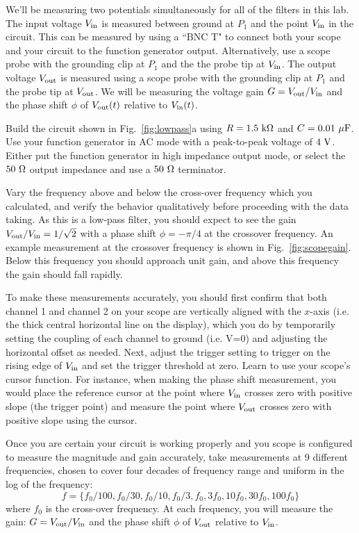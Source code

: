 \documentclass[12pt]{article}
\begin{document}
We'll be measuring two potentials simultaneously for all of the filters in this lab.  The input voltage $V_{\rm in}$ is measured between ground at $P_1$ and the point $V_{\rm in}$ in the circuit.  This can be measured by using a ``BNC T" to connect both your scope and your circuit to the function generator output.  Alternatively, use a scope probe with the grounding clip at $P_1$ and the the probe tip at $V_{\rm in}$.  The output voltage $V_{\rm out}$ is measured using a scope probe with the grounding clip at $P_1$ and the probe tip at $V_{\rm out}$.  We will be measuring the voltage gain $G = V_{\rm out} / V_{\rm in}$ and the phase shift $\phi$ of $V_{\rm out}(t)$ relative to $V_{\rm in}(t)$. 

Build the circuit shown in Fig.~\ref{fig:lowpass}a using $R=1.5~\rm k \Omega$ and $C= 0.01~\rm \mu F$.   Use your function generator in AC mode with a peak-to-peak voltage of $4~\rm V$.   Either put the function generator in high impedance output mode, or select the $50~\rm \Omega$ output impedance and use a $50~\rm \Omega$ terminator.

Vary the frequency above and below the cross-over frequency which you calculated, and verify the behavior qualitatively before proceeding with the data taking.  As this is a low-pass filter, you should expect to see the gain $V_{\rm out}/V_{\rm in} = 1/\sqrt{2}$ with a phase shift $\phi = -\pi/4$ at the crossover frequency.  An example measurement at the crossover frequency is shown in Fig.~\ref{fig:scopegain}.  Below this frequency you should approach unit gain, and above this frequency the gain should fall rapidly.  

To make these measurements accurately, you should first confirm that both channel 1 and channel 2 on your scope are vertically aligned with the $x$-axis (i.e. the thick central horizontal line on the display), which you do by temporarily setting the coupling of each channel to ground (i.e. V=0) and adjusting the horizontal offset as needed.  Next, adjust the trigger setting to trigger on the rising edge of $V_{\rm in}$ and set the trigger threshold at zero.  Learn to use your scope's cursor function.  For instance, when making the phase shift measurement, you would place the reference cursor at the point where 
$V_{\rm in}$ crosses zero with positive slope (the trigger point) and measure the point where $V_{\rm out}$ crosses zero with positive slope using the cursor.

Once you are certain your circuit is working properly and you scope is configured to measure the magnitude and gain accurately, take measurements at 9 different frequencies, chosen to cover four decades of frequency range and uniform in the log of the frequency:
\begin{displaymath}
f=\{f_0/100, f_0/30, f_0/10, f_0/3,f_0, 3f_0, 10f_0, 30f_0, 100f_0\}
\end{displaymath}
where $f_0$ is the cross-over frequency.  At each frequency, you will measure the gain:  $G = V_{\rm out} / V_{\rm in}$ and the phase shift $\phi$ of $V_{\rm out}$ relative to $V_{\rm in}$.  
\end{document}
